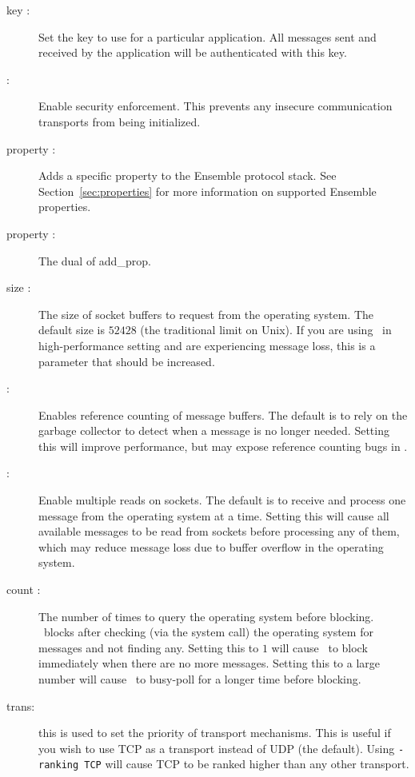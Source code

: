 \begin{description}
\item
[\mlval{-key} key :] Set the key to use for a particular application.  All
messages sent and received by the application will be authenticated with this
key.
\item
[\mlval{-secure} :] Enable security enforcement.  This prevents any insecure
communication transports from being initialized.
\item
[\mlval{-add\_prop} property :] Adds a specific property to the
Ensemble protocol stack. See Section~\ref{sec:properties} for more
information on supported Ensemble properties. 
\item 
[\mlval{-remove\_prop} property :] The dual of add\_prop.
\item 
[\mlval{-sock\_buf} size :] The size of socket buffers to request
from the operating system.  The default size is $52428$ (the
traditional limit on Unix).  If you are using \ensemble\ in
high-performance setting and are experiencing message loss, this is a
parameter that should be increased.
\item
[\mlval{-refcount} :] Enables reference counting of message buffers.
The default is to rely on the garbage collector to detect when a
message is no longer needed.  Setting this will improve performance,
but may expose reference counting bugs in \ensemble.
\item 
[\mlval{-multiread} :] Enable multiple reads on sockets.  The default
is to receive and process one message from the operating system
at a time.  Setting this will cause all available messages to be read
from sockets before processing any of them, which may reduce message
loss due to buffer overflow in the operating system.
\item
[\mlval{-pollcount} count :] The number of times to query the
operating system before blocking.  \ensemble\ blocks after checking
(via the  system call) the operating system for
messages and not finding any.  Setting this to $1$ will cause
\ensemble\ to block immediately when there are no more messages.
Setting this to a large number will cause \ensemble\ to busy-poll for
a longer time before blocking.
\item
[\mlval{-ranking} trans:] this is used to set the priority of
transport mechanisms. This is useful if you wish to use TCP as a
transport instead of UDP (the default). Using {\tt -ranking TCP} will
cause TCP to be ranked higher than any other transport. 
\end{description}

